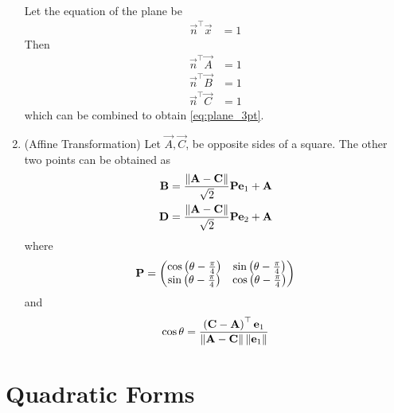 \documentclass[journal,12pt,twocolumn]{IEEEtran}
\renewcommand\thesection{\arabic{section}}
\renewcommand\thesubsection{\thesection.\arabic{subsection}}
\begin{document}
\begin{enumerate}[label=\thesubsection.\arabic*.,ref=\thesubsection.\theenumi]
\begin{align}
	\label{eq:plane_3pt}
\end{align}
\solution Let the equation of the plane be 
\begin{align}
	\vec{n}^{\top}	\vec{x} &= 1
\end{align}
Then 
\begin{align}
	\vec{n}^{\top}	\vec{A} &= 1
	\\
	\vec{n}^{\top}	\vec{B} &= 1
	\\
	\vec{n}^{\top}	\vec{C} &= 1
\end{align}
which can be combined to obtain 
	\eqref{eq:plane_3pt}.
%
\item (Affine Transformation) Let $\vec{A},\vec{C}$, be opposite sides of a square. The other two points can be obtained as  
\begin{align}
  \label{eq:square_points}
  \mathbf{B} = \frac{\left\lVert\mathbf{A}-\mathbf{C}\right\rVert}{\sqrt{2}} \mathbf{P}\mathbf{e}_1+\mathbf{A}
  \\
  \mathbf{D} = \frac{\left\lVert\mathbf{A}-\mathbf{C}\right\rVert}{\sqrt{2}} \mathbf{P}\mathbf{e}_2+\mathbf{A}
\end{align}
where 
\begin{align}
	\mathbf{P} = \begin{pmatrix}\cos \left(\theta-\frac{\pi}{4}\right) & \sin  \left(\theta-\frac{\pi}{4}\right) \\ \sin \left(\theta-\frac{\pi}{4}\right) & \cos \left(\theta-\frac{\pi}{4}\right)\end{pmatrix}
\end{align}
and 
\begin{align}
	\cos\theta = \frac{\left(\mathbf{C}-\mathbf{A}\right)^{\top}\mathbf{e}_1}{\left\lVert\mathbf{A}-\mathbf{C}\right\rVert\left\lVert\mathbf{e}_1\right\rVert}
\end{align}
\end{enumerate}
\section{Quadratic Forms}
\end{document}
